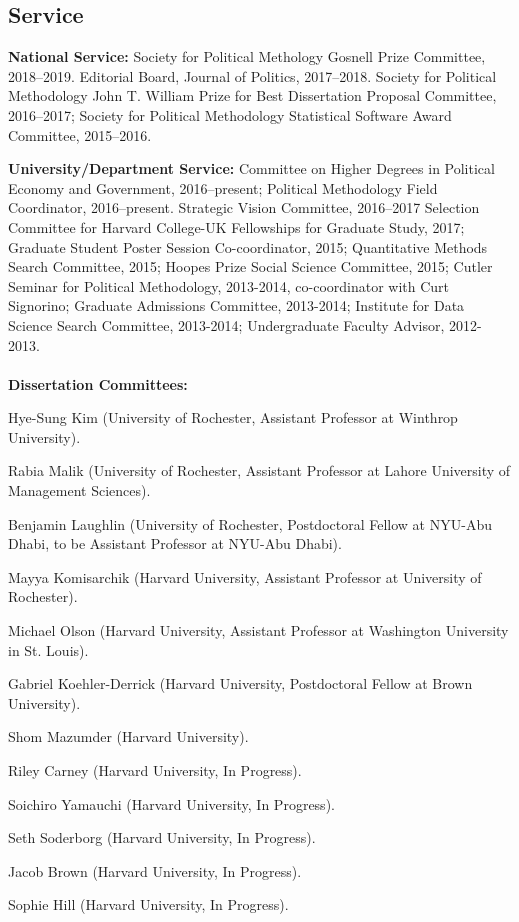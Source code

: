 \documentclass[margin,line,12pt]{res}
\newenvironment{list1}{
  \begin{list}{\ding{113}}{%
      \setlength{\itemsep}{0in}
      \setlength{\parsep}{0in} \setlength{\parskip}{0in}
      \setlength{\topsep}{0in} \setlength{\partopsep}{0in} 
      \setlength{\leftmargin}{0.83 cm}}}{\end{list}}
\begin{document}
\begin{resume}
\section{\sc Service}

\textbf{National Service:} Society for Political Methology Gosnell Prize Committee, 2018--2019. Editorial Board, Journal of Politics, 2017--2018.  Society for Political Methodology John T. William Prize for Best Dissertation Proposal Committee, 2016--2017; Society for Political Methodology Statistical Software Award Committee, 2015--2016.

\textbf{University/Department Service:} Committee on Higher Degrees in Political Economy and Government, 2016--present; Political Methodology Field Coordinator, 2016--present. Strategic Vision Committee, 2016--2017 Selection Committee for Harvard College-UK Fellowships for Graduate Study, 2017; Graduate Student Poster Session Co-coordinator, 2015; Quantitative Methods Search Committee, 2015; Hoopes Prize Social Science Committee, 2015; Cutler Seminar for Political Methodology, 2013-2014, co-coordinator with Curt Signorino; Graduate Admissions Committee, 2013-2014; Institute for Data Science Search Committee, 2013-2014; Undergraduate Faculty Advisor, 2012-2013. \\ 
\\
\textbf{Dissertation Committees:}
\begin{list1}
\item[] Hye-Sung Kim (University of Rochester, Assistant Professor at Winthrop University).
\item[] Rabia Malik (University of Rochester, Assistant Professor at Lahore University of Management Sciences).
\item[] Benjamin Laughlin (University of Rochester, Postdoctoral Fellow at NYU-Abu Dhabi, to be Assistant Professor at NYU-Abu Dhabi).
\item[] Mayya Komisarchik (Harvard University, Assistant Professor at University of Rochester).
\item[] Michael Olson (Harvard University, Assistant Professor at Washington University in St. Louis).
\item[] Gabriel Koehler-Derrick (Harvard University, Postdoctoral Fellow at Brown University).
\item[] Shom Mazumder (Harvard University).
\item[] Riley Carney (Harvard University, In Progress).
\item[] Soichiro Yamauchi (Harvard University, In Progress).
\item[] Seth Soderborg (Harvard University, In Progress).
\item[] Jacob Brown (Harvard University, In Progress).
\item[] Sophie Hill (Harvard University, In Progress).
\end{list1} 
 

\end{resume}
\end{document}

